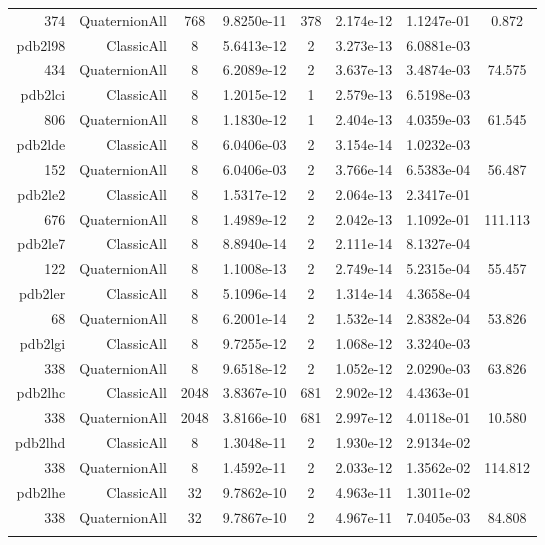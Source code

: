 \begin{xltabular}{\textwidth}{r|rcS[table-format=1.4e+2]cS[table-format=1.3e+2]S[table-format=1.4e+2]S[table-format=-1.3]}
374 & QuaternionAll & 768 & 9.8250e-11 & 378 & 2.174e-12 & 1.1247e-01 & 0.872\\  \addlinespace
pdb2l98 & ClassicAll & 8 & 5.6413e-12 & 2 & 3.273e-13 & 6.0881e-03 & \\
434 & QuaternionAll & 8 & 6.2089e-12 & 2 & 3.637e-13 & 3.4874e-03 & 74.575\\  \addlinespace
pdb2lci & ClassicAll & 8 & 1.2015e-12 & 1 & 2.579e-13 & 6.5198e-03 & \\
806 & QuaternionAll & 8 & 1.1830e-12 & 1 & 2.404e-13 & 4.0359e-03 & 61.545\\  \addlinespace
pdb2lde & ClassicAll & 8 & 6.0406e-03 & 2 & 3.154e-14 & 1.0232e-03 & \\
152 & QuaternionAll & 8 & 6.0406e-03 & 2 & 3.766e-14 & 6.5383e-04 & 56.487\\  \addlinespace
pdb2le2 & ClassicAll & 8 & 1.5317e-12 & 2 & 2.064e-13 & 2.3417e-01 & \\
676 & QuaternionAll & 8 & 1.4989e-12 & 2 & 2.042e-13 & 1.1092e-01 & 111.113\\  \addlinespace
pdb2le7 & ClassicAll & 8 & 8.8940e-14 & 2 & 2.111e-14 & 8.1327e-04 & \\
122 & QuaternionAll & 8 & 1.1008e-13 & 2 & 2.749e-14 & 5.2315e-04 & 55.457\\  \addlinespace
pdb2ler & ClassicAll & 8 & 5.1096e-14 & 2 & 1.314e-14 & 4.3658e-04 & \\
68 & QuaternionAll & 8 & 6.2001e-14 & 2 & 1.532e-14 & 2.8382e-04 & 53.826\\  \addlinespace
pdb2lgi & ClassicAll & 8 & 9.7255e-12 & 2 & 1.068e-12 & 3.3240e-03 & \\
338 & QuaternionAll & 8 & 9.6518e-12 & 2 & 1.052e-12 & 2.0290e-03 & 63.826\\  \addlinespace
pdb2lhc & ClassicAll & 2048 & 3.8367e-10 & 681 & 2.902e-12 & 4.4363e-01 & \\
338 & QuaternionAll & 2048 & 3.8166e-10 & 681 & 2.997e-12 & 4.0118e-01 & 10.580\\  \addlinespace
pdb2lhd & ClassicAll & 8 & 1.3048e-11 & 2 & 1.930e-12 & 2.9134e-02 & \\
338 & QuaternionAll & 8 & 1.4592e-11 & 2 & 2.033e-12 & 1.3562e-02 & 114.812\\  \addlinespace
pdb2lhe & ClassicAll & 32 & 9.7862e-10 & 2 & 4.963e-11 & 1.3011e-02 & \\
338 & QuaternionAll & 32 & 9.7867e-10 & 2 & 4.967e-11 & 7.0405e-03 & 84.808\\  \addlinespace

\end{xltabular}
